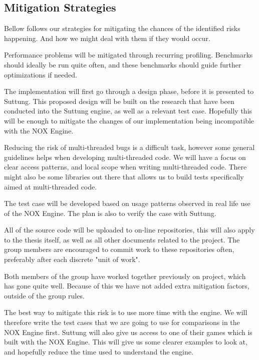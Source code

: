 \subsection{Mitigation Strategies}
Bellow follows our strategies for mitigating the chances of the identified risks happening.
And how we might deal with them if they would occur.

Performance problems will be mitigated through recurring profiling.
Benchmarks should ideally be run quite often,
and these benchmarks should guide further optimizations if needed.

The implementation will first go through a design phase,
before it is presented to Suttung. 
This proposed design will be built on the research
that have been conducted into the Suttung engine,
as well as a relevant test case.
Hopefully this will be enough to mitigate the changes
of our implementation being incompatible with the NOX Engine.

Reducing the risk of multi-threaded bugs is a difficult task, 
however some general guidelines helps when developing multi-threaded code.
We will have a focus on clear access patterns,
and local scope when writing multi-threaded code.
There might also be some libraries out there that
allows us to build tests specifically aimed at
multi-threaded code.

The test case will be developed based on usage patterns
observed in real life use of the NOX Engine.
The plan is also to verify the case with Suttung.

All of the source code will be uploaded to on-line repositories, 
this will also apply to the thesis itself, as well as
all other documents related to the project.
The group members are encouraged to commit work to these repositories often,
preferably after each discrete "unit of work".

Both members of the group have worked together previously on project,
which has gone quite well. 
Because of this we have not added extra mitigation factors, 
outside of the group rules.

The best way to mitigate this risk is to use more time with the engine.
We will therefore write the test cases that we are
going to use for comparisons in the NOX Engine first.
Suttung will also give us access to one of their games which is built with the NOX Engine.
This will give us some clearer examples to look at, and hopefully reduce the time 
used to understand the engine.

